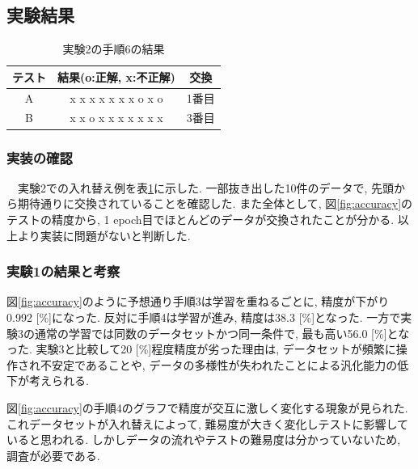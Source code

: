 \documentclass[twocolumn]{jarticle}     %
\begin{document}
\subsection{実験結果}

\begin{table}[tb]
	\begin{center}
		\caption{実験2の手順6の結果}
		\begin{tabular}{|c|c|c|} \hline
			テスト & 結果(o:正解, x:不正解) & 交換 \\ \hline
			A & x x x x x x x o x o & 1番目 \\
			B & x x o x x x x x x x & 3番目 \\ \hline
		\end{tabular}
		\label{tab:swap}
	\end{center}
\end{table}

\subsubsection{実装の確認}
　実験2での入れ替え例を表\ref{tab:swap}に示した. 一部抜き出した10件のデータで, 先頭から期待通りに交換されていることを確認した. また全体として, 図\ref{fig:accuracy}のテストの精度から, 1 epoch目でほとんどのデータが交換されたことが分かる. 以上より実装に問題がないと判断した.

\subsubsection{実験1の結果と考察}
	図\ref{fig:accuracy}のように予想通り手順3は学習を重ねるごとに, 精度が下がり0.992 [\%]になった. 反対に手順4は学習が進み, 精度は38.3 [\%]となった. 一方で実験3の通常の学習では同数のデータセットかつ同一条件で, 最も高い56.0 [\%]となった. 実験3と比較して20 [\%]程度精度が劣った理由は, データセットが頻繁に操作され不安定であることや, データの多様性が失われたことによる汎化能力の低下が考えられる.

	図\ref{fig:accuracy}の手順4のグラフで精度が交互に激しく変化する現象が見られた. これデータセットが入れ替えによって, 難易度が大きく変化しテストに影響していると思われる. しかしデータの流れやテストの難易度は分かっていないため, 調査が必要である.
\end{document}
